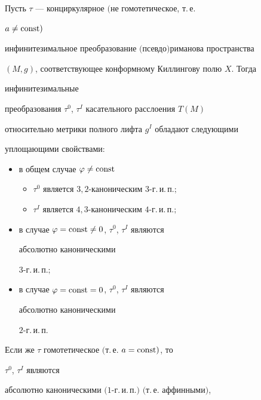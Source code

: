 \begin{thm}


Пусть $\tau$ --- конциркулярное $($не гомотетическое, т.\,е.


$a\ne\operatorname{const})$


инфинитезимальное преобразование $($псевдо$)$риманова пространства


$(M,g)$, соответствующее конформному Киллингову полю $X$. Тогда


инфинитезимальные


преобразования $\tau^0$, $\tau^I$ касательного расслоения $T(M)$


относительно метрики полного лифта $g^I$ обладают следующими


уплощающими свойствами$:$


\begin{itemize}


\item[I.] в общем случае $\varphi\ne\operatorname{const}$


\begin{itemize}


\item[0.] $\tau^0$ является $3,2$-каноническим $3$-г.\,и.\,п.$;$


\item[1.] $\tau^I$ является $4,3$-каноническим $4$-г.\,и.\,п.$;$


\end{itemize}


\item[II.] в случае $\varphi=\operatorname{const}\ne 0$, $\tau^0$, $\tau^I$ являются


абсолютно каноническими


$3$-г.\,и.\,п.$;$


\item[III.] в случае $\varphi=\operatorname{const}=0$, $\tau^0$, $\tau^I$ являются


абсолютно каноническими


$2$-г.\,и.\,п.


\end{itemize}


\end{thm}





Если же $\tau$ гомотетическое $($т.\,е. $a=\operatorname{const})$, то


$\tau^0$, $\tau^I$ являются


абсолютно каноническими $(1$-г.\,и.\,п.$)$ $($т.\,е. аффинными$)$,


